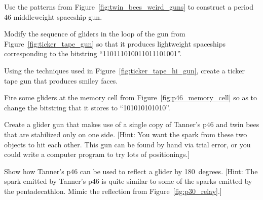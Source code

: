 \begin{multicols}{2}
\mfilbreak


\begin{problem}\label{exer:twin_bees_mwss_gun}
	Use the patterns from Figure~\ref{fig:twin_bees_weird_guns} to construct a period~$46$ middleweight spaceship gun.
\end{problem}


\mfilbreak


\begin{problem}\label{exer:ticker_tape_gun_store_different}
	Modify the sequence of gliders in the loop of the gun from Figure~\ref{fig:ticker_tape_gun} so that it produces lightweight spaceships corresponding to the bitstring ``110111010011011101001''.
\end{problem}


\mfilbreak


\begin{problem}\label{exer:ticker_tape_smiley_gun}
	Using the techniques used in Figure~\ref{fig:ticker_tape_hi_gun}, create a ticker tape gun that produces smiley faces.
\end{problem}


\mfilbreak


\begin{problem}\label{exer:ticker_tape_gun_memory_alter}
	Fire some gliders at the memory cell from Figure~\ref{fig:p46_memory_cell} so as to change the bitstring that it stores to ``101010101010''.
\end{problem}


\mfilbreak


\begin{problem}\label{exer:tanners_p46_twin_bee_gun}
	Create a glider gun that makes use of a single copy of Tanner's p$46$ and twin bees that are stabilized only on one side. [Hint: You want the spark from these two objects to hit each other. This gun can be found by hand via trial error, or you could write a computer program to try lots of positionings.]
\end{problem}


\mfilbreak


\begin{problem}\label{exer:tanners_p46_reflect}
	Show how Tanner's p$46$ can be used to reflect a glider by 180~degrees. [Hint: The spark emitted by Tanner's p$46$ is quite similar to some of the sparks emitted by the pentadecathlon. Mimic the reflection from Figure~\ref{fig:p30_relay}.]
\end{problem}



\end{multicols}
